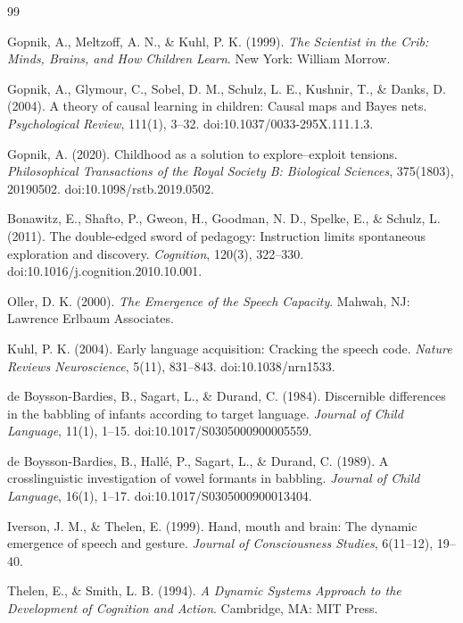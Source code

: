 \documentclass[11pt]{article}
\begin{document}
\begin{thebibliography}{99}


 Gopnik, A., Meltzoff, A. N., \& Kuhl, P. K. (1999). \emph{The Scientist in the Crib: Minds, Brains, and How Children Learn}. New York: William Morrow.

 Gopnik, A., Glymour, C., Sobel, D. M., Schulz, L. E., Kushnir, T., \& Danks, D. (2004). A theory of causal learning in children: Causal maps and Bayes nets. \emph{Psychological Review}, 111(1), 3--32. doi:10.1037/0033-295X.111.1.3.

 Gopnik, A. (2020). Childhood as a solution to explore--exploit tensions. \emph{Philosophical Transactions of the Royal Society B: Biological Sciences}, 375(1803), 20190502. doi:10.1098/rstb.2019.0502.

 Bonawitz, E., Shafto, P., Gweon, H., Goodman, N. D., Spelke, E., \& Schulz, L. (2011). The double-edged sword of pedagogy: Instruction limits spontaneous exploration and discovery. \emph{Cognition}, 120(3), 322--330. doi:10.1016/j.cognition.2010.10.001.


 Oller, D. K. (2000). \emph{The Emergence of the Speech Capacity}. Mahwah, NJ: Lawrence Erlbaum Associates.

 Kuhl, P. K. (2004). Early language acquisition: Cracking the speech code. \emph{Nature Reviews Neuroscience}, 5(11), 831--843. doi:10.1038/nrn1533.

 de Boysson-Bardies, B., Sagart, L., \& Durand, C. (1984). Discernible differences in the babbling of infants according to target language. \emph{Journal of Child Language}, 11(1), 1--15. doi:10.1017/S0305000900005559.

 de Boysson-Bardies, B., Hall\'e, P., Sagart, L., \& Durand, C. (1989). A crosslinguistic investigation of vowel formants in babbling. \emph{Journal of Child Language}, 16(1), 1--17. doi:10.1017/S0305000900013404.

 Iverson, J. M., \& Thelen, E. (1999). Hand, mouth and brain: The dynamic emergence of speech and gesture. \emph{Journal of Consciousness Studies}, 6(11--12), 19--40.

 Thelen, E., \& Smith, L. B. (1994). \emph{A Dynamic Systems Approach to the Development of Cognition and Action}. Cambridge, MA: MIT Press.


\end{thebibliography}
\end{document}
